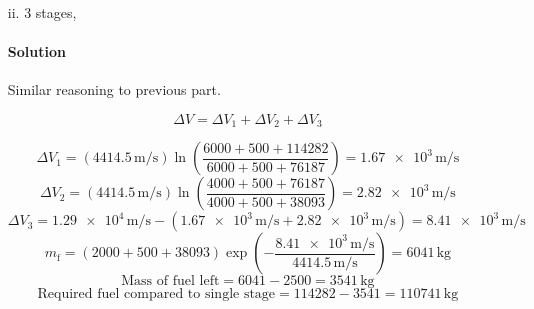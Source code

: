 \documentclass{article}
\begin{document}
{\begin{enumerate}
\begin{enumerate}
			
			\item[ii.] 3 stages,
			\paragraph{Solution} Similar reasoning to previous part.
			
			\[
				\Delta V = \Delta V_1 + \Delta V_2 + \Delta V_3
			\]
			
			\[
				\Delta V_1 = (\num{4414.5} \, \unit{\meter\per\second}) \ln \left( \frac{6000 + 500 + 114282}{6000 + 500 + 76187} \right) = \num{1.67e3} \, \unit{\meter\per\second}
			\]
			\[
				\Delta V_2 = (\num{4414.5} \, \unit{\meter\per\second}) \ln \left( \frac{4000 + 500 + 76187}{4000 + 500 + 38093} \right) = \num{2.82e3} \, \unit{\meter\per\second}
			\]
			\[
				\Delta V_3 = \num{1.29e4} \, \unit{\meter\per\second} - (\num{1.67e3} \, \unit{\meter\per\second} + \num{2.82e3} \, \unit{\meter\per\second}) = \num{8.41e3} \, \unit{\meter\per\second}
			\]
			\[
				m_\mathrm{f} = (2000 + 500 + 38093) \exp \left( -\frac{\num{8.41e3} \, \unit{\meter\per\second}}{\num{4414.5} \, \unit{\meter\per\second}} \right) = \num{6041} \, \unit{\kilogram}
			\]
			\[
				\text{Mass of fuel left} = 6041 - 2500 = \num{3541} \, \unit{\kilogram}
			\]
			\[
				\text{Required fuel compared to single stage} = 114282 - 3541 = \num{110741} \, \unit{\kilogram}
			\] 
			

\end{enumerate}
\end{enumerate}}
\end{document}
